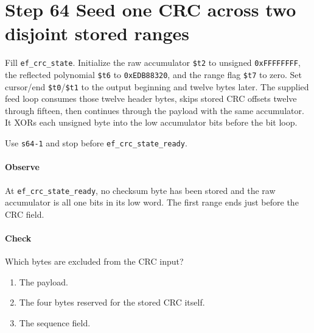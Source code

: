 \section{Step 64 Seed one CRC across two disjoint stored ranges}
Fill \texttt{ef\_crc\_state}. Initialize the raw accumulator \texttt{\$t2} to unsigned \texttt{0xFFFFFFFF}, the reflected polynomial \texttt{\$t6} to \texttt{0xEDB88320}, and the range flag \texttt{\$t7} to zero. Set cursor/end \texttt{\$t0}/\texttt{\$t1} to the output beginning and twelve bytes later. The supplied feed loop consumes those twelve header bytes, skips stored CRC offsets twelve through fifteen, then continues through the payload with the same accumulator. It XORs each unsigned byte into the low accumulator bits before the bit loop.

Use \texttt{s64-1} and stop before \texttt{ef\_crc\_state\_ready}.

\paragraph{Observe} At \texttt{ef\_crc\_state\_ready}, no checksum byte has been stored and the raw accumulator is all one bits in its low word. The first range ends just before the CRC field.

\paragraph{Check} Which bytes are excluded from the CRC input?
\begin{enumerate}[label=\Alph*.]
\item The payload.
\item The four bytes reserved for the stored CRC itself.
\item The sequence field.
\end{enumerate}
